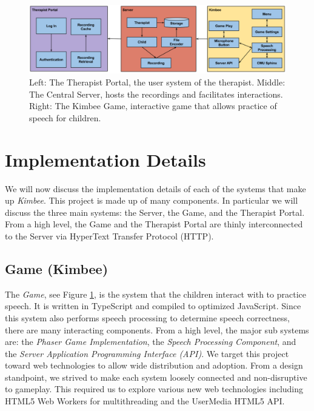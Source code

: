 \documentclass{sig-alternate-2013}
\begin{document}
\begin{figure}[t]
  \centering
  \includegraphics[keepaspectratio, width=\textwidth]{tech_figure.png}
  \vspace{-23 pt}
  \caption{\normalfont Left: The Therapist Portal, the user system of the therapist. Middle: The Central Server, hosts the recordings and facilitates interactions. Right: The Kimbee Game, interactive game that allows practice of speech for children. }
  \label{fig:tech}
\end{figure}

\section{Implementation Details}

We will now discuss the implementation details of each of the systems that make up {\em Kimbee}. This project is made up of many components. In particular we will discuss the three main systems: the Server, the Game, and the Therapist Portal. From a high level, the Game and the Therapist Portal are thinly interconnected to the Server via HyperText Transfer Protocol (HTTP).

\subsection{Game ({\secit Kimbee})}
The {\em Game}, see Figure \ref{fig:tech}, is the system that the children interact with to practice speech. It is written in TypeScript and compiled to optimized JavaScript. Since this system also performs speech processing to determine speech correctness, there are many interacting components. From a high level, the major sub systems are: the {\em Phaser Game Implementation}, the {\em Speech Processing Component}, and the {\em Server Application Programming Interface (API)}. We target this project toward web technologies to allow wide distribution and adoption. From a design standpoint, we strived to make each system loosely connected and non-disruptive to gameplay. This required us to explore various new web technologies including HTML5 Web Workers for multithreading and the UserMedia HTML5 API.
\end{document}
